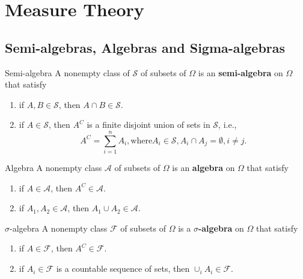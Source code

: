 \chapter{Measure Theory}

\section{Semi-algebras, Algebras and Sigma-algebras}

\begin{definition}{Semi-algebra}{}
    A nonempty class of $\mathcal{S}$ of subsets of $\Omega$ is an \textbf{semi-algebra} on $\Omega$ that satisfy
    \begin{enumerate}
        \item if $A,B\in\mathcal{S}$, then $A\cap B\in\mathcal{S}$.
        \item if $A\in\mathcal{S}$, then $A^C$ is a finite disjoint union of sets in $\mathcal{S}$, i.e., $$A^C=\sum_{i=1}^{n}A_i, \text{where} A_i\in\mathcal{S}, A_i\cap A_j=\emptyset ,i\neq j.$$
    \end{enumerate}
\end{definition}

\begin{definition}{Algebra}{}
    A nonempty class $\mathcal{A}$ of subsets of $\Omega$ is an \textbf{algebra} on $\Omega$ that satisfy
    \begin{enumerate}
        \item if $A\in\mathcal{A}$, then $A^C\in\mathcal{A}$.
        \item if $A_1, A_2\in\mathcal{A}$, then $A_1\cup A_2\in\mathcal{A}$. 
    \end{enumerate}
\end{definition}



\begin{definition}{$\sigma$-algebra}{}
    A nonempty class $\mathcal{F}$ of subsets of $\Omega$ is a \textbf{$\sigma$-algebra} on $\Omega$ that satisfy
    \begin{enumerate}
        \item if $A\in\mathcal{F}$, then $A^C\in\mathcal{F}$.
        \item if $A_i\in\mathcal{F}$ is a countable sequence of sets, then $\cup_iA_i\in\mathcal{F}$.
    \end{enumerate}
\end{definition}

